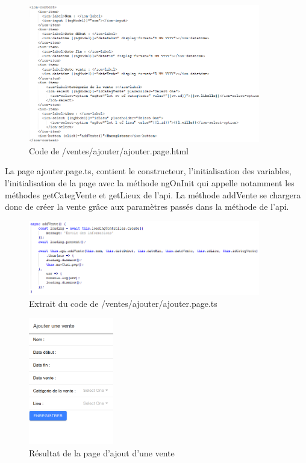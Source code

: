 			\begin{figure}[H]
				\centering\includegraphics[width=0.9\textwidth, keepaspectratio]{res/ajouter.png}
				\caption{Code de /ventes/ajouter/ajouter.page.html}
			\end{figure}

			La page ajouter.page.ts, contient le constructeur, l'initialisation des variables, l'initialisation de la page avec la méthode ngOnInit qui appelle notamment les méthodes getCategVente et getLieux de l'api.\newline
			La méthode addVente se chargera donc de créer la vente grâce aux paramètres passés dans la méthode de l'api.

			\begin{figure}[H]
				\centering\includegraphics[width=0.9\textwidth, keepaspectratio]{res/ajouterTs.png}
				\caption{Extrait du code de /ventes/ajouter/ajouter.page.ts}
			\end{figure}

			\begin{figure}[H]
				\centering\includegraphics[width=0.33\textwidth, keepaspectratio]{res/ajouterVente.png}
				\caption{Résultat de la page d'ajout d'une vente}
			\end{figure}

